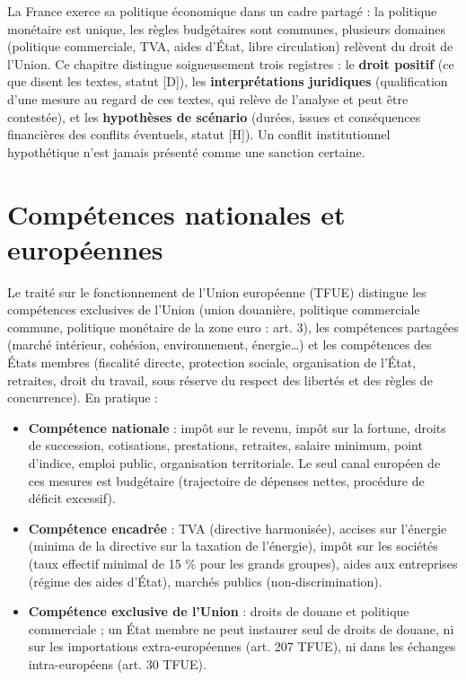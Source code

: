 \documentclass[
  11pt,
  11pt,
  a4paper,
  openany]{book}
\providecommand{\tightlist}{%
  \setlength{\itemsep}{0pt}\setlength{\parskip}{0pt}}
\begin{document}
La France exerce sa politique économique dans un cadre partagé : la
politique monétaire est unique, les règles budgétaires sont communes,
plusieurs domaines (politique commerciale, TVA, aides d'État, libre
circulation) relèvent du droit de l'Union. Ce chapitre distingue
soigneusement trois registres : le \textbf{droit positif} (ce que disent
les textes, statut {[}D{]}), les \textbf{interprétations juridiques}
(qualification d'une mesure au regard de ces textes, qui relève de
l'analyse et peut être contestée), et les \textbf{hypothèses de
scénario} (durées, issues et conséquences financières des conflits
éventuels, statut {[}H{]}). Un conflit institutionnel hypothétique n'est
jamais présenté comme une sanction certaine.

\hypertarget{sec:competences}{%
\section{Compétences nationales et européennes}\label{sec:competences}}

Le traité sur le fonctionnement de l'Union européenne (TFUE) distingue
les compétences exclusives de l'Union (union douanière, politique
commerciale commune, politique monétaire de la zone euro : art. 3), les
compétences partagées (marché intérieur, cohésion, environnement,
énergie\ldots) et les compétences des États membres (fiscalité directe,
protection sociale, organisation de l'État, retraites, droit du travail,
sous réserve du respect des libertés et des règles de concurrence). En
pratique :

\begin{itemize}
\tightlist
\item
  \textbf{Compétence nationale} : impôt sur le revenu, impôt sur la
  fortune, droits de succession, cotisations, prestations, retraites,
  salaire minimum, point d'indice, emploi public, organisation
  territoriale. Le seul canal européen de ces mesures est budgétaire
  (trajectoire de dépenses nettes, procédure de déficit excessif).
\item
  \textbf{Compétence encadrée} : TVA (directive harmonisée), accises sur
  l'énergie (minima de la directive sur la taxation de l'énergie), impôt
  sur les sociétés (taux effectif minimal de 15 \% pour les grands
  groupes), aides aux entreprises (régime des aides d'État), marchés
  publics (non-discrimination).
\item
  \textbf{Compétence exclusive de l'Union} : droits de douane et
  politique commerciale ; un État membre ne peut instaurer seul de
  droits de douane, ni sur les importations extra-européennes (art. 207
  TFUE), ni dans les échanges intra-européens (art. 30 TFUE).
\end{itemize}
\end{document}
